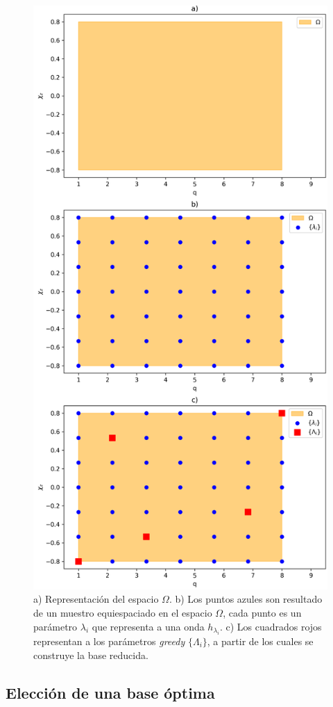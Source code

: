 \begin{figure}[p!]
\centering
\includegraphics[width=.75\columnwidth]{figs/rb_visual.png}
\caption{a) Representación del espacio $\Omega$. b) Los puntos azules son resultado de un muestro equiespaciado en el espacio $\Omega$, cada punto es un parámetro $\lambda_i$ que representa a una onda $h_{\lambda_i}$. c) Los cuadrados rojos representan a los parámetros \textit{greedy} $\{\Lambda_i\}$, a partir de los cuales se construye la base reducida.}
\label{fig:visual_rb}
\end{figure}

\subsection{Elección de una base óptima}


